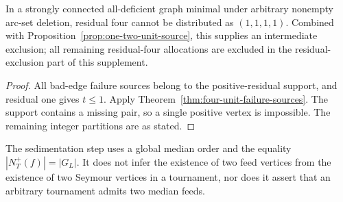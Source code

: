 \begin{corollary}
\label{cor:no-four-unit-residuals}
In a strongly connected all-deficient graph minimal under arbitrary
nonempty arc-set deletion, residual four cannot be distributed as
$(1,1,1,1)$. Combined with
Proposition~\ref{prop:one-two-unit-source}, this supplies an intermediate exclusion; all remaining residual-four allocations are excluded in the residual-exclusion part of this supplement.
\end{corollary}
\begin{proof}
All bad-edge failure sources belong to the positive-residual support,
and residual one gives $t\le1$. Apply
Theorem~\ref{thm:four-unit-failure-sources}.
The support contains a missing pair, so a single positive vertex is
impossible. The remaining integer partitions are as stated.
\end{proof}

The sedimentation step uses a global median order and the equality
$|N_T^+(f)|=|G_L|$. It does not infer the existence of two feed vertices
from the existence of two Seymour vertices in a tournament, nor does
it assert that an arbitrary tournament admits two median feeds.
